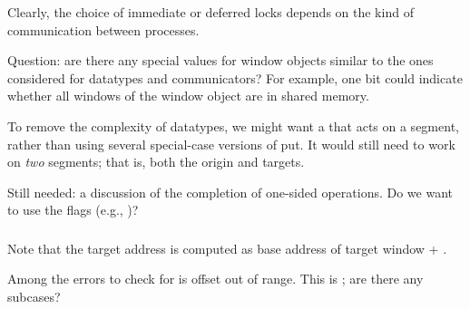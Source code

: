 \documentclass{article}
\begin{document}
Clearly, the choice of immediate or deferred locks depends on the kind
of communication between processes.

Question: are there any special values for window objects similar to the ones
considered for datatypes and communicators?  For example, one bit could
indicate whether all windows of the window object are in shared memory.

To remove the complexity of datatypes, we might want a
 that acts on a segment, rather than using several
special-case versions of put.  It would still need to work on \emph{two}
segments; that is, both the origin and targets.

Still needed: a discussion of the completion of one-sided operations.  Do we
want to use the flags (e.g., )?

\subsubsection{}

Note that the target address is computed as base address of target window +
.

Among the errors to check for is offset out of range.  This is
; are there any subcases?





\end{document}
